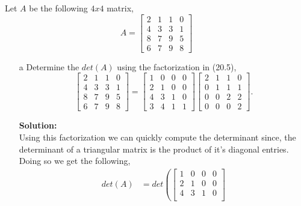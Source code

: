 \documentclass[12pt]{article}
\makeatletter
\theoremstyle{homework}
\newenvironment{exercise}[1]
{\def\@currentlabel{#1}\exercisecore}
{\endexercisecore}
\newcommand{\localhead}[1]{\par\smallskip\noindent\textbf{#1}\nobreak\\}%
\newcommand\solution{\localhead{Solution:}}
\makeatother
\begin{document}
\vspace{1in}









\begin{exercise}{21.1} Let $A$ be the following $4x4$ matrix, 
  \begin{equation*}
    A = 
    \begin{bmatrix}
      2& 1 &1 &0\\ 
      4& 3 &3 &1\\
      8& 7 &9 &5\\
      6& 7 &9 &8
    \end{bmatrix}
  \end{equation*} 
  \begin{enumerate}
    \item[a] Determine the $det(A)$ using the factorization in (20.5), 
    \begin{equation*}
      \begin{bmatrix}
        2& 1 &1 &0\\ 
        4& 3 &3 &1\\
        8& 7 &9 &5\\
        6& 7 &9 &8
      \end{bmatrix}
       = 
       \begin{bmatrix}
         1&0&0&0\\
         2& 1&0 &0\\
         4& 3& 1&0\\
         3& 4& 1& 1
       \end{bmatrix}
       \begin{bmatrix}
         2 &1 &1& 0\\
         0 &1 &1& 1 \\
         0 &0 &2& 2 \\
         0 &0 &0& 2
       \end{bmatrix}.
    \end{equation*} 
    \solution Using this factorization we can quickly compute the determinant since, the determinant of a triangular matrix is the product of it's diagonal entries. Doing so we get the following, 
    \begin{align*}
      det(A) &= det\left( \begin{bmatrix}
        1&0&0&0\\
        2& 1&0 &0\\
        4& 3& 1&0\\

\end{bmatrix}
\end{align*}
\end{enumerate}
\end{exercise}
\end{document}
